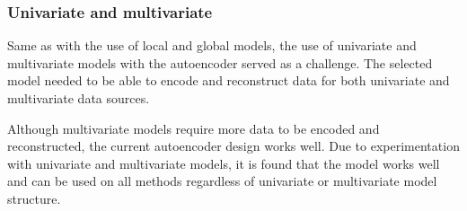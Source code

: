 \subsubsection{Univariate and multivariate}
Same as with the use of local and global models,
the use of univariate and multivariate models with the autoencoder served as a challenge.
The selected model needed to be able to encode and reconstruct data for both univariate and multivariate data sources.

Although multivariate models require more data to be encoded and reconstructed,
the current autoencoder design works well.
Due to experimentation with univariate and multivariate models,
it is found that the model works well and can be used on all methods regardless of univariate or multivariate model structure.




